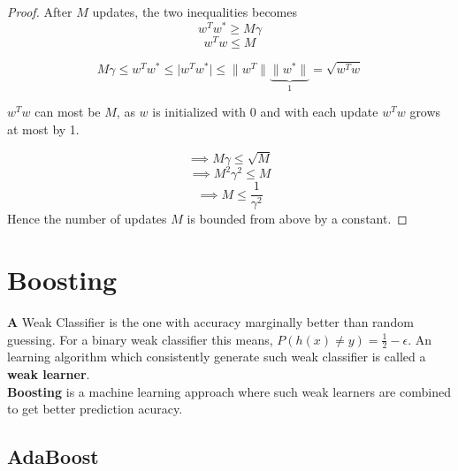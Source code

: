 \documentclass[12pt]{article}
\begin{document}
\begin{proof}
     
     \cleardoublepage
     
     After $M$ updates, the two inequalities becomes $$w^{T}w^{*} \geq M\gamma$$  $$w^{T}w \leq M$$
 
 $$M\gamma \leq w^{T}w^{*} \leq \vert w^{T}w^{*} \vert \leq \| w^{T} \| \underbrace{\|w^{*}\|}_\text{1}=\sqrt{w^{T}w}$$
 
 $w^{T}w$ can most be $M$, as $w$ is initialized with 0 and with each update $w^{T}w$ grows at most by 1.
 
 $$\implies M\gamma \leq \sqrt{M} $$
 $$\implies M^{2}\gamma^{2} \leq M$$
 $$\implies M \leq \frac{1}{\gamma ^{2}}$$  Hence the number of updates $M$ is bounded from above by a constant.
  
 
 	
 \end{proof}
 
 \section{Boosting}
 \textbf A {Weak Classifier} is the one with accuracy marginally better than random guessing. For a binary  weak classifier this means, $P(h(x) \neq y) = \frac{1}{2} - \epsilon .$ An learning algorithm which consistently generate such weak classifier is called a \textbf{weak learner}.\\ \textbf{Boosting} is a machine learning approach where such weak learners are combined to get better prediction acuracy.\\


\cleardoublepage

 \subsection{AdaBoost}
 
\end{document}
